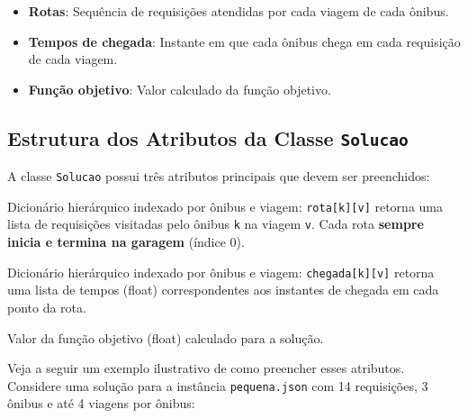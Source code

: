 \documentclass[12pt,a4paper]{article}
\begin{document}
\begin{itemize}
    \item \textbf{Rotas}: Sequência de requisições atendidas por cada viagem de cada ônibus.
    \item \textbf{Tempos de chegada}: Instante em que cada ônibus chega em cada requisição de cada viagem.
    \item \textbf{Função objetivo}: Valor calculado da função objetivo.
\end{itemize}

\subsection{Estrutura dos Atributos da Classe \texttt{Solucao}}

A classe \texttt{Solucao} possui três atributos principais que devem ser preenchidos:

\begin{description}[leftmargin=3cm,style=nextline]
    \item[\texttt{rota}] Dicionário hierárquico indexado por ônibus e viagem: \texttt{rota[k][v]} retorna uma lista de requisições visitadas pelo ônibus \texttt{k} na viagem \texttt{v}. Cada rota \textbf{sempre inicia e termina na garagem} (índice 0).
    
    \item[\texttt{chegada}] Dicionário hierárquico indexado por ônibus e viagem: \texttt{chegada[k][v]} retorna uma lista de tempos (float) correspondentes aos instantes de chegada em cada ponto da rota.
    
    \item[\texttt{fx}] Valor da função objetivo (float) calculado para a solução.
\end{description}

Veja a seguir um exemplo ilustrativo de como preencher esses atributos. Considere uma solução para a instância \texttt{pequena.json} com 14 requisições, 3 ônibus e até 4 viagens por ônibus:
\end{document}
